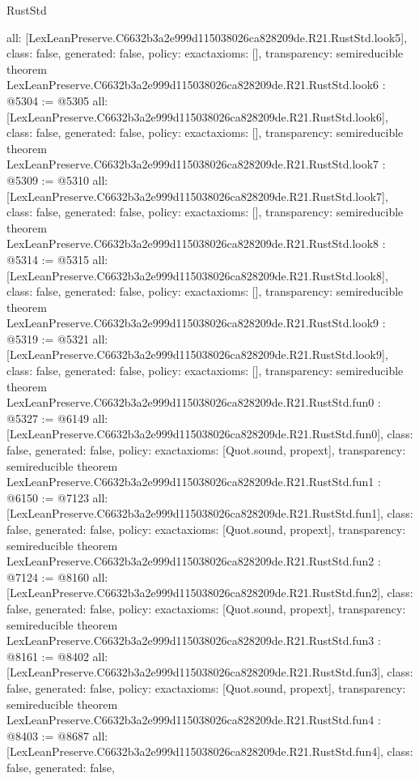 \begin{lexlean}{RustStd}
\begin{coremodule}
{  all: [LexLeanPreserve.C6632b3a2e999d115038026ca828209de.R21.RustStd.look5],
  class: false,
  generated: false,
  policy: exact{axioms: []},
  transparency: semireducible
}
theorem LexLeanPreserve.C6632b3a2e999d115038026ca828209de.R21.RustStd.look6 : @5304 := @5305 {
  all: [LexLeanPreserve.C6632b3a2e999d115038026ca828209de.R21.RustStd.look6],
  class: false,
  generated: false,
  policy: exact{axioms: []},
  transparency: semireducible
}
theorem LexLeanPreserve.C6632b3a2e999d115038026ca828209de.R21.RustStd.look7 : @5309 := @5310 {
  all: [LexLeanPreserve.C6632b3a2e999d115038026ca828209de.R21.RustStd.look7],
  class: false,
  generated: false,
  policy: exact{axioms: []},
  transparency: semireducible
}
theorem LexLeanPreserve.C6632b3a2e999d115038026ca828209de.R21.RustStd.look8 : @5314 := @5315 {
  all: [LexLeanPreserve.C6632b3a2e999d115038026ca828209de.R21.RustStd.look8],
  class: false,
  generated: false,
  policy: exact{axioms: []},
  transparency: semireducible
}
theorem LexLeanPreserve.C6632b3a2e999d115038026ca828209de.R21.RustStd.look9 : @5319 := @5321 {
  all: [LexLeanPreserve.C6632b3a2e999d115038026ca828209de.R21.RustStd.look9],
  class: false,
  generated: false,
  policy: exact{axioms: []},
  transparency: semireducible
}
theorem LexLeanPreserve.C6632b3a2e999d115038026ca828209de.R21.RustStd.fun0 : @5327 := @6149 {
  all: [LexLeanPreserve.C6632b3a2e999d115038026ca828209de.R21.RustStd.fun0],
  class: false,
  generated: false,
  policy: exact{axioms: [Quot.sound, propext]},
  transparency: semireducible
}
theorem LexLeanPreserve.C6632b3a2e999d115038026ca828209de.R21.RustStd.fun1 : @6150 := @7123 {
  all: [LexLeanPreserve.C6632b3a2e999d115038026ca828209de.R21.RustStd.fun1],
  class: false,
  generated: false,
  policy: exact{axioms: [Quot.sound, propext]},
  transparency: semireducible
}
theorem LexLeanPreserve.C6632b3a2e999d115038026ca828209de.R21.RustStd.fun2 : @7124 := @8160 {
  all: [LexLeanPreserve.C6632b3a2e999d115038026ca828209de.R21.RustStd.fun2],
  class: false,
  generated: false,
  policy: exact{axioms: [Quot.sound, propext]},
  transparency: semireducible
}
theorem LexLeanPreserve.C6632b3a2e999d115038026ca828209de.R21.RustStd.fun3 : @8161 := @8402 {
  all: [LexLeanPreserve.C6632b3a2e999d115038026ca828209de.R21.RustStd.fun3],
  class: false,
  generated: false,
  policy: exact{axioms: [Quot.sound, propext]},
  transparency: semireducible
}
theorem LexLeanPreserve.C6632b3a2e999d115038026ca828209de.R21.RustStd.fun4 : @8403 := @8687 {
  all: [LexLeanPreserve.C6632b3a2e999d115038026ca828209de.R21.RustStd.fun4],
  class: false,
  generated: false,
}
\end{coremodule}
\end{lexlean}

